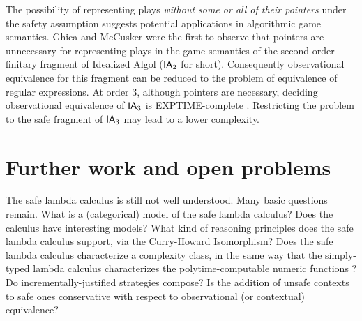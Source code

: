 The possibility of representing plays \emph{without some or all of
  their pointers} under the safety assumption suggests potential
applications in algorithmic game semantics. Ghica and McCusker
\cite{ghicamccusker00} were the first to observe that pointers are
unnecessary for representing plays in the game semantics of the
second-order finitary fragment of Idealized Algol ($\textsf{IA}_2$ for
short). Consequently observational equivalence for this fragment can
be reduced to the problem of equivalence of regular expressions.  At
order $3$, although pointers are necessary, deciding observational
equivalence of $\textsf{IA}_3$ is EXPTIME-complete
\cite{DBLP:journals/apal/Ong04,DBLP:conf/fossacs/MurawskiW05}. Restricting
the problem to the safe fragment of $\textsf{IA}_3$ may lead to a lower
complexity.





\section{Further work and open problems}

The safe lambda calculus is still not well understood. Many basic
questions remain. What is a (categorical) model of the safe lambda
calculus? Does the calculus have interesting models?  What kind of
reasoning principles does the safe lambda calculus support, via the
Curry-Howard Isomorphism? Does the safe lambda calculus characterize a complexity class, in the same way that the simply-typed lambda calculus characterizes the polytime-computable numeric functions \cite{DBLP:conf/tlca/LeivantM93}?  Do incrementally-justified strategies compose? Is the addition of
unsafe contexts to safe ones conservative with respect to observational (or contextual) equivalence?

